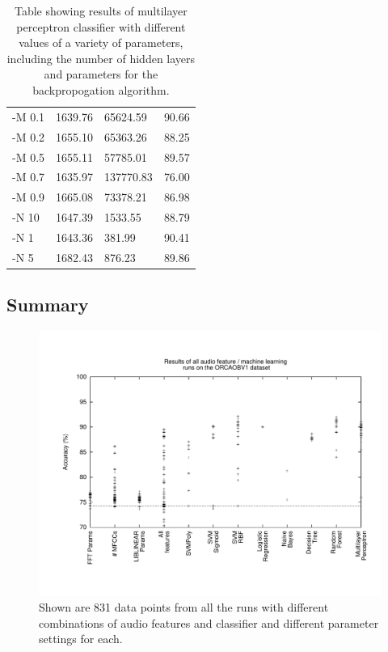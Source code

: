\begin{table}
\begin{tabular}{|l|l|l|l|}
 -M 0.1       &  1639.76  &     65624.59  &  90.66  \\
 -M 0.2       &  1655.10  &     65363.26  &  88.25  \\
 -M 0.5       &  1655.11  &     57785.01  &  89.57  \\
 -M 0.7       &  1635.97  &    137770.83  &  76.00  \\
 -M 0.9       &  1665.08  &     73378.21  &  86.98  \\
 -N 10        &  1647.39  &      1533.55  &  88.79  \\
 -N 1         &  1643.36  &       381.99  &  90.41  \\
 -N 5         &  1682.43  &       876.23  &  89.86  \\
\hline
\end{tabular}
\caption{Table showing results of
  multilayer perceptron classifier with different values of a variety
  of parameters, including the number of hidden layers and parameters
  for the backpropogation algorithm.}
\label{table:obv-weka-multilayerPerceptron}
\end{table}


\subsection{Summary}

\begin{figure}[t]
\centering
\includegraphics[width=\columnwidth]{figures/gnuplot-obv-all-data}
\caption{Shown are 831 data points from all the runs with different
  combinations of audio features and classifier and different
  parameter settings for each.}
\label{fig:gnuplot-obv-all-data}
\end{figure}

